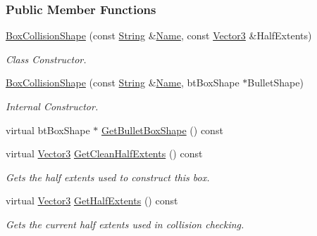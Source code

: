 \subsubsection*{Public Member Functions}
\begin{DoxyCompactItemize}
\item 
\hyperlink{classMezzanine_1_1BoxCollisionShape_afcf359b8683bd158040963eca43ac670}{BoxCollisionShape} (const \hyperlink{namespaceMezzanine_acf9fcc130e6ebf08e3d8491aebcf1c86}{String} \&\hyperlink{classMezzanine_1_1CollisionShape_aac524c5c56fa4d158bc071f8aecfbe79}{Name}, const \hyperlink{classMezzanine_1_1Vector3}{Vector3} \&HalfExtents)
\begin{DoxyCompactList}\small\item\em Class Constructor. \item\end{DoxyCompactList}\item 
\hyperlink{classMezzanine_1_1BoxCollisionShape_ae715de5cb9f343f10973f06bf4f9acbb}{BoxCollisionShape} (const \hyperlink{namespaceMezzanine_acf9fcc130e6ebf08e3d8491aebcf1c86}{String} \&\hyperlink{classMezzanine_1_1CollisionShape_aac524c5c56fa4d158bc071f8aecfbe79}{Name}, btBoxShape $\ast$BulletShape)
\begin{DoxyCompactList}\small\item\em Internal Constructor. \item\end{DoxyCompactList}\item 
virtual btBoxShape $\ast$ \hyperlink{classMezzanine_1_1BoxCollisionShape_a408a3b15bf4425d827c7cf4ee908efef}{GetBulletBoxShape} () const 
\item 
virtual \hyperlink{classMezzanine_1_1Vector3}{Vector3} \hyperlink{classMezzanine_1_1BoxCollisionShape_a5214ce314dc7d383ae81995e618f87cb}{GetCleanHalfExtents} () const 
\begin{DoxyCompactList}\small\item\em Gets the half extents used to construct this box. \item\end{DoxyCompactList}\item 
virtual \hyperlink{classMezzanine_1_1Vector3}{Vector3} \hyperlink{classMezzanine_1_1BoxCollisionShape_a4e1193a0cfed37f268ae1730de7b8d08}{GetHalfExtents} () const 
\begin{DoxyCompactList}\small\item\em Gets the current half extents used in collision checking. \item\end{DoxyCompactList}\item 

\end{DoxyCompactItemize}
